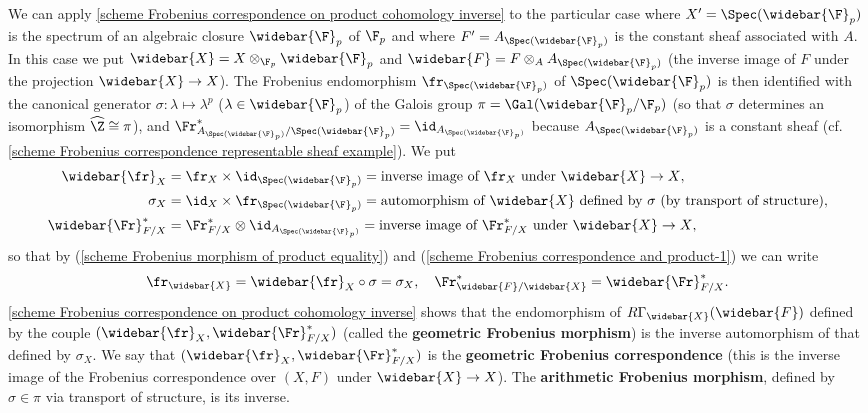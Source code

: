 \begin{example}
We can apply \cref{scheme Frobenius correspondence on product cohomology inverse} to the particular case where $X'=\Spec(\widebar{\F}_p)$ is the spectrum of an algebraic closure $\widebar{\F}_p$ of $\F_p$ and where $F'=A_{\Spec(\widebar{\F}_p)}$ is the constant sheaf associated with $A$. In this case we put $\widebar{X}=X\otimes_{\F_p}\widebar{\F}_p$ and $\widebar{F}=F\otimes_AA_{\Spec(\widebar{\F}_p)}$ (the inverse image of $F$ under the projection $\widebar{X}\to X$). The Frobenius endomorphism $\fr_{\Spec(\widebar{\F}_p)}$ of $\Spec(\widebar{\F}_p)$ is then identified with the canonical generator $\sigma:\lambda\mapsto\lambda^p$ ($\lambda\in\widebar{\F}_p$) of the Galois group $\pi=\Gal(\widebar{\F}_p/\F_p)$ (so that $\sigma$ determines an isomorphism $\widehat{\Z}\cong\pi$), and $\Fr^*_{A_{\Spec(\widebar{\F}_p)}/\Spec(\widebar{\F}_p)}=\id_{A_{\Spec(\widebar{\F}_p)}}$ because $A_{\Spec(\widebar{\F}_p)}$ is a constant sheaf (cf. \cref{scheme Frobenius correspondence representable sheaf example}). We put
\begin{align*}
\widebar{\fr}_X&=\fr_X\times\id_{\Spec(\widebar{\F}_p)}=\text{inverse image of $\fr_X$ under $\widebar{X}\to X$},\\
\sigma_X&=\id_X\times\fr_{\Spec(\widebar{\F}_p)}=\text{automorphism of $\widebar{X}$ defined by $\sigma$ (by transport of structure)},\\
\widebar{\Fr}_{F/X}^*&=\Fr_{F/X}^*\otimes\id_{A_{\Spec(\widebar{\F}_p)}}=\text{inverse image of $\Fr_{F/X}^*$ under $\widebar{X}\to X$},
\end{align*}
so that by (\ref{scheme Frobenius morphism of product equality}) and (\ref{scheme Frobenius correspondence and product-1}) we can write
\begin{equation}\label{scheme Frobenius morphism of algebraic closure equality}
\fr_{\widebar{X}}=\widebar{\fr}_X\circ\sigma=\sigma_X,\quad \Fr_{\widebar{F}/\widebar{X}}^*=\widebar{\Fr}_{F/X}^*.
\end{equation}
\cref{scheme Frobenius correspondence on product cohomology inverse} shows that the endomorphism of $R\Gamma_{\widebar{X}}(\widebar{F})$ defined by the couple $(\widebar{\fr}_X,\widebar{\Fr}_{F/X}^*)$ (called the \textbf{geometric Frobenius morphism}) is the inverse automorphism of that defined by $\sigma_X$. We say that $(\widebar{\fr}_X,\widebar{\Fr}_{F/X}^*)$ is the \textbf{geometric Frobenius correspondence} (this is the inverse image of the Frobenius correspondence over $(X,F)$ under $\widebar{X}\to X$). The \textbf{arithmetic Frobenius morphism}, defined by $\sigma\in\pi$ via transport of structure, is its inverse.
\end{example}


